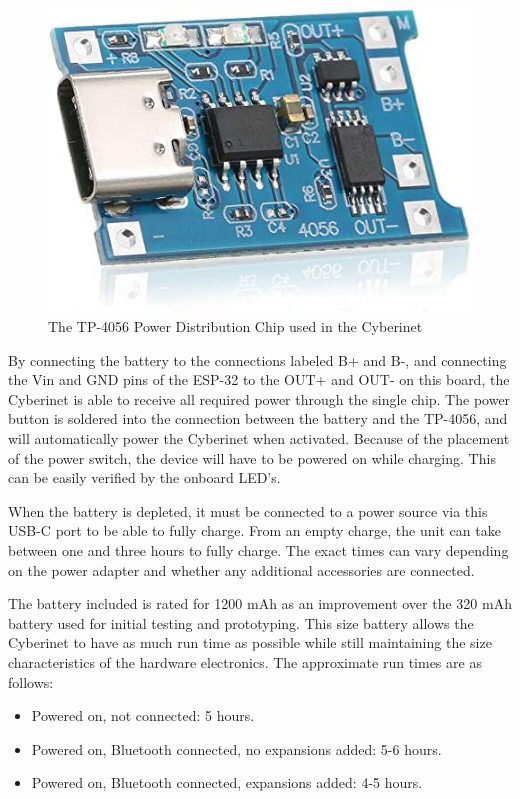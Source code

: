 \begin{center}
    \begin{figure}
        \centering
        \includegraphics[scale=0.5]{diagrams/oem/4056.jpg}
        \caption{The TP-4056 Power Distribution Chip used in the Cyberinet}
        \label{fig:tp5046}
    \end{figure}
\end{center}

By connecting the battery to the connections labeled B+ and B-, and connecting the Vin and GND pins of the ESP-32 to the OUT+ and OUT- on this board, the Cyberinet is able to receive all required power through the single chip. The power button is soldered into the connection between the battery and the TP-4056, and will automatically power the Cyberinet when activated. Because of the placement of the power switch, the device will have to be powered on while charging. This can be easily verified by the onboard LED's. 

When the battery is depleted, it must be connected to a power source via this USB-C port to be able to fully charge. From an empty charge, the unit can take between one and three hours to fully charge. The exact times can vary depending on the power adapter and whether any additional accessories are connected. 

The battery included is rated for 1200 mAh as an improvement over the 320 mAh battery used for initial testing and prototyping. This size battery allows the Cyberinet to have as much run time as possible while still maintaining the size characteristics of the hardware electronics. The approximate run times are as follows:

\begin{itemize}
    \item Powered on, not connected: 5 hours.
    \item Powered on, Bluetooth connected, no expansions added: 5-6 hours.
    \item Powered on, Bluetooth connected, expansions added: 4-5 hours.
\end{itemize}


